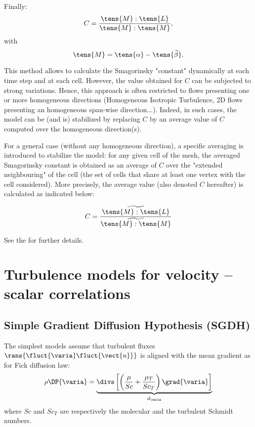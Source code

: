 Finally:
\begin{equation}
C = \frac{ \tens{M} : \tens{L} }{ \tens{M} : \tens{M}},
\end{equation}
with
\begin{equation}
\tens{M} = \tens{\alpha} - \tens{\widetilde{\beta}}.
\end{equation}

This method allows to calculate the Smagorinsky "constant" dynamically at
each time step and at each cell. However, the value obtained for $C$ can be
subjected to strong variations. Hence, this approach is often restricted to
flows presenting one or more homogeneous directions (Homogeneous Isotropic
Turbulence, 2D flows presenting an homogeneous span-wise direction...).
Indeed, in such cases, the model can be (and is) stabilized by replacing $C$
by an average value of $C$ computed over the homogeneous direction(s).

For a general case (without any homogeneous direction), a specific averaging
is introduced to stabilize the model: for any given cell of the mesh, the
averaged Smagorinsky constant is obtained as an average of $C$ over the
"extended neighbouring" of the cell (the set of cells that share at least
one vertex with the cell considered). More precisely, the average value
(also denoted $C$ hereafter) is calculated as indicated below:

\begin{equation}
C = \frac{\widetilde{ \tens{M} : \tens{L}}} {\widetilde{ \tens{M} : \tens{M}}}
\end{equation}

See the  for further details.


\section{Turbulence models for velocity -- scalar correlations}

\subsection{Simple Gradient Diffusion Hypothesis (SGDH)}
The simplest models assume that turbulent fluxes $ \rans{\fluct{\varia} \fluct{\vect{u}}}$ is aligned with the mean gradient as for Fick diffusion law:
\begin{equation}\label{eq:sgdh}
  \rho \DP{\varia}=
  \underbrace{\divs \left[\left( \dfrac{\mu}{Sc} + \dfrac{\mu_T}{Sc_T} \right) \grad{\varia} \right]}_{d_\varia}
\end{equation}
where $Sc$ and $Sc_T$ are respectively the molecular and the turbulent Schmidt numbers.


